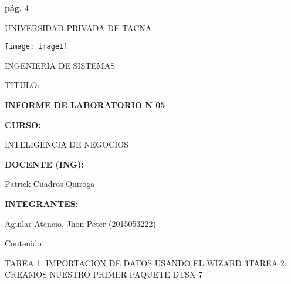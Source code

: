 \documentclass{article} %
\begin{document}


\noindent 

\noindent 

\noindent 

\noindent 

\noindent \textbf{ p\'{a}g. }4\textbf{}

\noindent UNIVERSIDAD PRIVADA DE TACNA

\noindent \texttt{[image: image1]}

\noindent 

\noindent 

\noindent 

\noindent 

\noindent 

\noindent 

\noindent INGENIERIA DE SISTEMAS

\noindent 

\noindent 

\noindent 

\noindent TITULO:

\noindent 

\noindent \textbf{INFORME DE LABORATORIO N 05}

\noindent \textbf{CURSO:}

\noindent INTELIGENCIA DE NEGOCIOS

\noindent \textbf{DOCENTE (ING):}

\noindent Patrick Cuadros Quiroga

\noindent \textbf{INTEGRANTES:}

\noindent 

\noindent Aguilar Atencio, Jhon Peter     (2015053222)

\noindent 

\noindent 

\noindent 

\noindent Contenido

\noindent TAREA 1: IMPORTACION DE DATOS USANDO EL WIZARD 3TAREA 2: CREAMOS NUESTRO PRIMER PAQUETE DTSX 7

\noindent 

\noindent 

\noindent 

\noindent 

\noindent 

\noindent 

\noindent 
\end{document}
